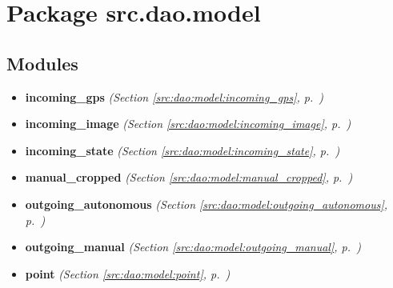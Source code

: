 %
%
%


\section{Package src.dao.model}

    \label{src:dao:model}


\subsection{Modules}

\begin{itemize}
\setlength{\parskip}{0ex}
\item \textbf{incoming\_gps}
  \textit{(Section \ref{src:dao:model:incoming_gps}, p.~\pageref{src:dao:model:incoming_gps})}

\item \textbf{incoming\_image}
  \textit{(Section \ref{src:dao:model:incoming_image}, p.~\pageref{src:dao:model:incoming_image})}

\item \textbf{incoming\_state}
  \textit{(Section \ref{src:dao:model:incoming_state}, p.~\pageref{src:dao:model:incoming_state})}

\item \textbf{manual\_cropped}
  \textit{(Section \ref{src:dao:model:manual_cropped}, p.~\pageref{src:dao:model:manual_cropped})}

\item \textbf{outgoing\_autonomous}
  \textit{(Section \ref{src:dao:model:outgoing_autonomous}, p.~\pageref{src:dao:model:outgoing_autonomous})}

\item \textbf{outgoing\_manual}
  \textit{(Section \ref{src:dao:model:outgoing_manual}, p.~\pageref{src:dao:model:outgoing_manual})}

\item \textbf{point}
  \textit{(Section \ref{src:dao:model:point}, p.~\pageref{src:dao:model:point})}

\end{itemize}


